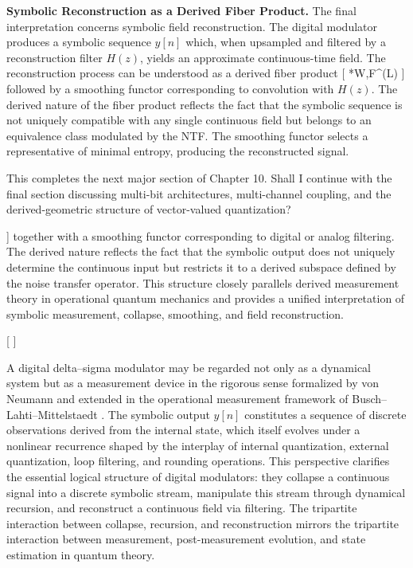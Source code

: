 \textbf{Symbolic Reconstruction as a Derived Fiber Product.}
The final interpretation concerns symbolic field reconstruction. The digital modulator produces a symbolic sequence $y[n]$ which, when upsampled and filtered by a reconstruction filter $H(z)$, yields an approximate continuous-time field. The reconstruction process can be understood as a derived fiber product
[
*{W,F}^{(L)}  \Lambda
]
followed by a smoothing functor corresponding to convolution with $H(z)$. The derived nature of the fiber product reflects the fact that the symbolic sequence is not uniquely compatible with any single continuous field but belongs to an equivalence class modulated by the NTF. The smoothing functor selects a representative of minimal entropy, producing the reconstructed signal.

\medskip

This completes the next major section of Chapter 10.
Shall I continue with the final section discussing multi-bit architectures, multi-channel coupling, and the derived-geometric structure of vector-valued quantization?

]
together with a smoothing functor corresponding to digital or analog filtering. The derived nature reflects the fact that the symbolic output does not uniquely determine the continuous input but restricts it to a derived subspace defined by the noise transfer operator. This structure closely parallels derived measurement theory in operational quantum mechanics \cite{busch1996quantummeasurement} and provides a unified interpretation of symbolic measurement, collapse, smoothing, and field reconstruction.

\medskip

[
]

A digital delta–sigma modulator may be regarded not only as a dynamical system but as a measurement device in the rigorous sense formalized by von Neumann \cite{vonneumann1932foundations} and extended in the operational measurement framework of Busch–Lahti–Mittelstaedt \cite{busch1996quantummeasurement}. The symbolic output $y[n]$ constitutes a sequence of discrete observations derived from the internal state, which itself evolves under a nonlinear recurrence shaped by the interplay of internal quantization, external quantization, loop filtering, and rounding operations. This perspective clarifies the essential logical structure of digital modulators: they collapse a continuous signal into a discrete symbolic stream, manipulate this stream through dynamical recursion, and reconstruct a continuous field via filtering. The tripartite interaction between collapse, recursion, and reconstruction mirrors the tripartite interaction between measurement, post-measurement evolution, and state estimation in quantum theory.

